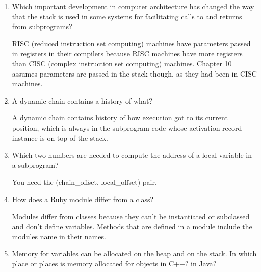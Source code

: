 \begin{enumerate}
\begin{answer}
    \end{answer}

  \item Which important development in computer architecture
    has changed the way that the stack is used in some
    systems for facilitating calls to and returns from
    subprograms?

 \begin{answer}

    RISC (reduced instruction set computing) machines have parameters passed in
 registers in their compilers because RISC machines have more registers than CISC
 (complex instruction set computing) machines. Chapter 10 assumes parameters are
 passed in the stack though, as they had been in CISC machines.

    \end{answer}

  \item A dynamic chain contains a history of what?

 \begin{answer}

    A dynamic chain contains history of how execution got to its current position,
which is always in the subprogram code whose activation record instance is on top
of the stack.

    \end{answer}

  \item Which two numbers are needed to compute
    the address of a local variable in a subprogram?

 \begin{answer}

    You need the (chain_offset, local_offset) pair.

    \end{answer}

  \item How does a Ruby module differ from a class?

 \begin{answer}

    Modules differ from classes because they can't be instantiated or subclassed
and don't define variables.  Methods that are defined in a module include the
modules name in their names.

    \end{answer}

  \item Memory for variables can be allocated on the heap
    and on the stack. In which place or places is memory
    allocated for objects in C++? in Java?


\end{enumerate}
